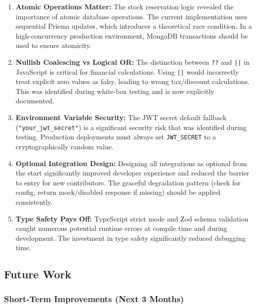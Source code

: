 \documentclass[12pt,onecolumn]{IEEEtran}
\begin{document}
\begin{enumerate}[leftmargin=1.5em]
  \item \textbf{Atomic Operations Matter:} The stock reservation logic revealed the importance of atomic database operations. The current implementation uses sequential Prisma updates, which introduces a theoretical race condition. In a high-concurrency production environment, MongoDB transactions should be used to ensure atomicity.
  \item \textbf{Nullish Coalescing vs Logical OR:} The distinction between \texttt{??} and \texttt{||} in JavaScript is critical for financial calculations. Using \texttt{||} would incorrectly treat explicit zero values as falsy, leading to wrong tax/discount calculations. This was identified during white-box testing and is now explicitly documented.
  \item \textbf{Environment Variable Security:} The JWT secret default fallback (\texttt{"your\_jwt\_secret"}) is a significant security risk that was identified during testing. Production deployments must always set \texttt{JWT\_SECRET} to a cryptographically random value.
  \item \textbf{Optional Integration Design:} Designing all integrations as optional from the start significantly improved developer experience and reduced the barrier to entry for new contributors. The graceful degradation pattern (check for config, return mock/disabled response if missing) should be applied consistently.
  \item \textbf{Type Safety Pays Off:} TypeScript strict mode and Zod schema validation caught numerous potential runtime errors at compile time and during development. The investment in type safety significantly reduced debugging time.
\end{enumerate}

\subsection{Future Work}

\subsubsection{Short-Term Improvements (Next 3 Months)}
\end{document}
